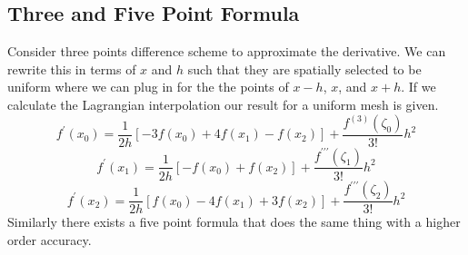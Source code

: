 \subsection{Three and Five Point Formula}
Consider three points difference scheme to approximate the derivative. We can rewrite this in terms of \(x\) and \(h\) such that 
they are spatially selected to be uniform where we can plug in for the the points of \(x-h\), \(x\), and \(x+h\). If we calculate the 
Lagrangian interpolation our result for a uniform mesh is given. 
\[
    f^{\prime} (x_{0} ) = \frac{1}{2h}\left[ 
        -3 f(x_0) + 4f(x_1) - f(x_2)
     \right] + \frac{f^{(3)} (\zeta_0)}{3!} h^{2} 
\]   
\[
    f^{\prime} (x_1) = \frac{1}{2h} \left[ -f(x_0) + f(x_2) \right] + \frac{f^{\prime\prime\prime} (\zeta_1)}{3!}h^{2} 
\]
\[
    f^{\prime} (x_2) = \frac{1}{2h} \left[ 
        f(x_0) -4 f(x_1) +3 f(x_2)
     \right] + \frac{f^{\prime\prime\prime} (\zeta_2)}{3!} h^{2} 
\]
Similarly there exists a five point formula that does the same thing with a higher order accuracy. 